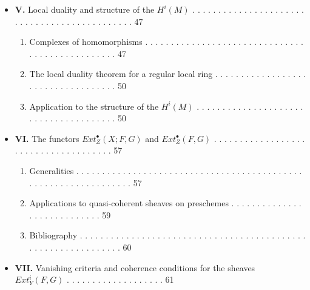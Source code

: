 \documentclass[
  11pt,
  a4paper,
]{book}
\providecommand{\tightlist}{%
  \setlength{\itemsep}{0pt}\setlength{\parskip}{0pt}}
\begin{document}
\begin{itemize}
  \begin{enumerate}
  \def\labelenumi{\arabic{enumi}.}
  \tightlist
  \item
    Generalities on module functors . . . . . . . . . . . . . . . . . .
    . . . . . . . . . . . . . . . . . . . . . . . . . . . . . 33
  \item
    Characterization of exact functors . . . . . . . . . . . . . . . . .
    . . . . . . . . . . . . . . . . . . . . . . . . . . . . 36
  \item
    Study of the case where \(T\) is left exact and \(T(M)\) is of
    finite type for every \(M\) . . . . . . . . . . . 37
  \item
    Dualizing module; dualizing functor . . . . . . . . . . . . . . . .
    . . . . . . . . . . . . . . . . . . . . . . . . . . . . 39
  \item
    Consequences of the theory of dualizing modules . . . . . . . . . .
    . . . . . . . . . . . . . . . . . . . . . . 43
  \end{enumerate}
\item
  \textbf{V.} Local duality and structure of the \(H^{i}(M)\) . . . . .
  . . . . . . . . . . . . . . . . . . . . . . . . . . . . . . . . . . .
  . . . . . 47

  \begin{enumerate}
  \def\labelenumi{\arabic{enumi}.}
  \tightlist
  \item
    Complexes of homomorphisms . . . . . . . . . . . . . . . . . . . . .
    . . . . . . . . . . . . . . . . . . . . . . . . . . . 47
  \item
    The local duality theorem for a regular local ring . . . . . . . . .
    . . . . . . . . . . . . . . . . . . . . . . . . . . 50
  \item
    Application to the structure of the \(H^{i}(M)\) . . . . . . . . . .
    . . . . . . . . . . . . . . . . . . . . . . . . . . . . 50
  \end{enumerate}
\item
  \textbf{VI.} The functors \(Ext^{\bullet}_{Z}(X; F, G)\) and
  \(Ext^{\bullet}_{Z}(F, G)\) . . . . . . . . . . . . . . . . . . . . .
  . . . . . . . . . . . . . . . . 57

  \begin{enumerate}
  \def\labelenumi{\arabic{enumi}.}
  \tightlist
  \item
    Generalities . . . . . . . . . . . . . . . . . . . . . . . . . . . .
    . . . . . . . . . . . . . . . . . . . . . . . . . . . . . . . . . .
    . . 57
  \item
    Applications to quasi-coherent sheaves on preschemes . . . . . . . .
    . . . . . . . . . . . . . . . . . . . . 59
  \item
    Bibliography . . . . . . . . . . . . . . . . . . . . . . . . . . . .
    . . . . . . . . . . . . . . . . . . . . . . . . . . . . . . . . . .
    60
  \end{enumerate}
\item
  \textbf{VII.} Vanishing criteria and coherence conditions for the
  sheaves \(Ext^{i}_{Y}(F, G)\) . . . . . . . . . . . . . . . . . . . 61


\end{itemize}
\end{document}
